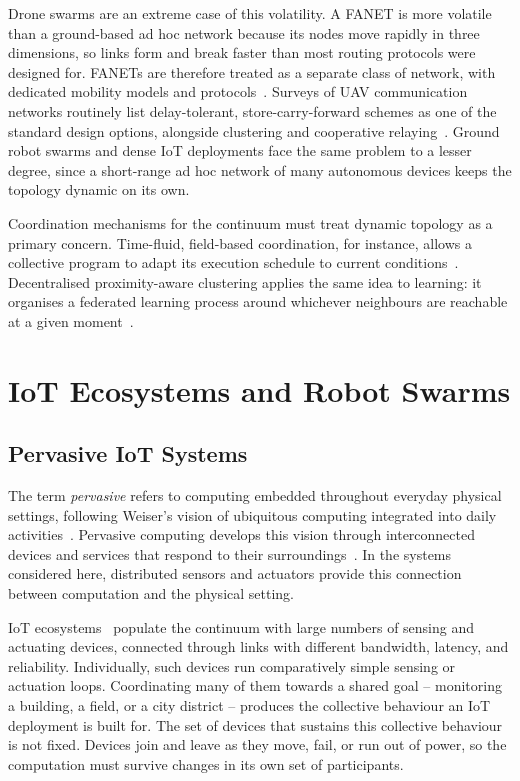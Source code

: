 Drone swarms are an extreme case of this volatility.
%
A \ac{FANET} is more volatile than a ground-based ad hoc network because its nodes move rapidly in three dimensions,
so links form and break faster than most routing protocols were designed for.
%
\acp{FANET} are therefore treated as a separate class of network,
with dedicated mobility models and protocols~\cite{DBLP:journals/adhoc/BekmezciST13}.
%
Surveys of \ac{UAV} communication networks routinely list delay-tolerant,
store-carry-forward schemes as one of the standard design options,
alongside clustering and cooperative relaying~\cite{DBLP:journals/comsur/GuptaJV16}.
%
Ground robot swarms and dense \ac{IoT} deployments face the same problem to a lesser degree,
since a short-range ad hoc network of many autonomous devices keeps the topology dynamic on its own.

Coordination mechanisms for the continuum must treat dynamic topology as a primary concern.
%
Time-fluid, field-based coordination, for instance, allows a collective program to adapt its execution schedule to current conditions~\cite{DBLP:journals/lmcs/PianiniCVMZ21}.
%
Decentralised proximity-aware clustering applies the same idea to learning:
it organises a federated learning process around whichever neighbours are reachable at a given moment~\cite{DBLP:journals/iot/DominiFAVE26}.

\section{IoT Ecosystems and Robot Swarms}
\label{sec:target-environments}

\subsection{Pervasive IoT Systems}
\label{subsec:iot-systems}

The term \emph{pervasive} refers to computing embedded throughout everyday physical settings,
following Weiser's vision of ubiquitous computing integrated into daily activities~\cite{Weiser1991Computer}.
Pervasive computing develops this vision through interconnected devices and services that respond to their surroundings~\cite{Satyanarayanan2001Pervasive}.
In the systems considered here, distributed sensors and actuators provide this connection between computation and the physical setting.

\ac{IoT} ecosystems~\cite{DBLP:journals/cn/AtzoriIM10} populate the continuum with large numbers of sensing and actuating devices,
connected through links with different bandwidth, latency, and reliability.
%
Individually, such devices run comparatively simple sensing or actuation loops.
%
Coordinating many of them towards a shared goal -- monitoring a building,
a field,
or a city district -- produces the collective behaviour an \ac{IoT} deployment is built for.
%
The set of devices that sustains this collective behaviour is not fixed.
Devices join and leave as they move,
fail,
or run out of power,
so the computation must survive changes in its own set of participants.

